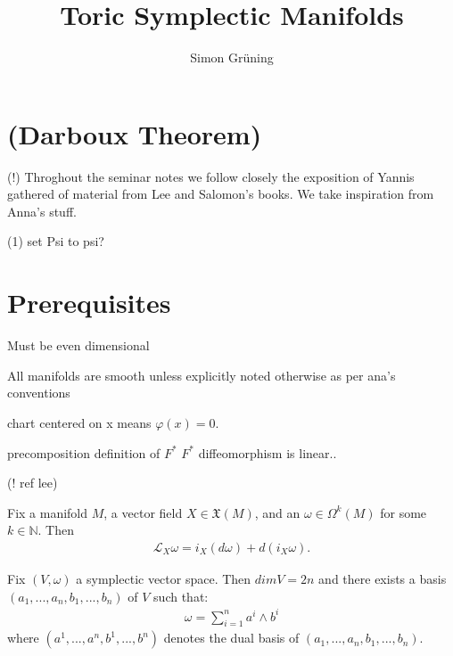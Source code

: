 


\title{Toric Symplectic Manifolds}
\author{Simon Gr\"uning}
\address[Simon Gr\"uning]{University of Zurich, R\"{a}mistrasse 71, 8006 Zurich}


\maketitle

\section*{(Darboux Theorem)}


\clearpage

(!) Throghout the seminar notes we follow closely the exposition of Yannis gathered of material from Lee and Salomon's books. We take inspiration from Anna's stuff.

(1) set Psi to psi?


\section{Prerequisites}

\begin{remark}
Must be even dimensional

All manifolds are smooth unless explicitly noted otherwise as per ana's conventions

chart centered on x means $\varphi(x) = 0$.


precomposition definition of $F^*$
$F^*$ diffeomorphism is linear..


\end{remark}

\begin{proposition}
(! ref lee)

Fix a manifold $M$, a vector field $X \in \mathfrak{X}(M)$, and an $\omega \in \Omega^k(M)$ for some $k \in \mathbb{N}$. Then
\begin{align*}
\mathcal{L}_X \omega = i_X(d \omega) + d(i_X \omega).
\end{align*}
\end{proposition}

\begin{theorem} \label{canform} 
Fix $(V,\omega)$ a symplectic vector space. Then $dimV = 2n$ and there exists a basis $(a_1,...,a_n,b_1, ...,b_n)$ of $V$ such that:
\begin{align*}
\omega = \sum^n_{i=1} a^i \wedge b^i
\end{align*}
where $(a^1, ... , a^n,b^1, ... ,b^n)$ denotes the dual basis of $(a_1,...,a_n,b_1, ...,b_n)$.
\end{theorem}

